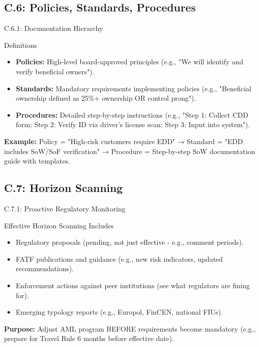 \documentclass{beamer}
\begin{document}
	\subsection{C.6: Policies, Standards, Procedures}
	
	\begin{frame}{C.6.1: Documentation Hierarchy}
		\begin{block}{Definitions}
			\begin{itemize}
				\item \textbf{Policies:} High-level board-approved principles (e.g., "We will identify and verify beneficial owners").
				\item \textbf{Standards:} Mandatory requirements implementing policies (e.g., "Beneficial ownership defined as 25\%+ ownership OR control prong").
				\item \textbf{Procedures:} Detailed step-by-step instructions (e.g., "Step 1: Collect CDD form; Step 2: Verify ID via driver's license scan; Step 3: Input into system").
			\end{itemize}
		\end{block}
		\textbf{Example:} Policy = "High-risk customers require EDD" → Standard = "EDD includes SoW/SoF verification" → Procedure = Step-by-step SoW documentation guide with templates.
	\end{frame}
	
	\subsection{C.7: Horizon Scanning}
	
	\begin{frame}{C.7.1: Proactive Regulatory Monitoring}
		\begin{block}{Effective Horizon Scanning Includes}
			\begin{itemize}
				\item Regulatory proposals (pending, not just effective - e.g., comment periods).
				\item FATF publications and guidance (e.g., new risk indicators, updated recommendations).
				\item Enforcement actions against peer institutions (see what regulators are fining for).
				\item Emerging typology reports (e.g., Europol, FinCEN, national FIUs).
			\end{itemize}
		\end{block}
		\textbf{Purpose:} Adjust AML program BEFORE requirements become mandatory (e.g., prepare for Travel Rule 6 months before effective date).
	\end{frame}
	
\end{document}

